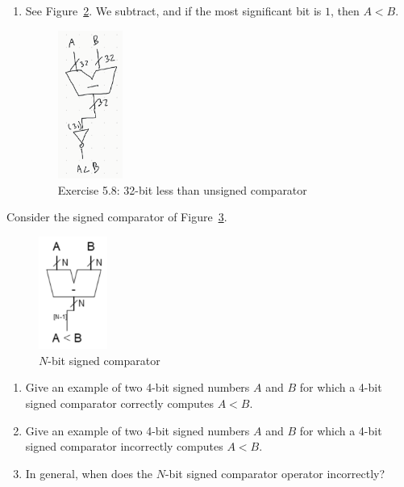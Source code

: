 \documentclass[12pt]{article}
\newenvironment{ex}[2][Exercise]{\begin{trivlist}
		\item[\hskip \labelsep {\bfseries #1}\hskip \labelsep {\bfseries #2.}]}{\end{trivlist}}
\newenvironment{sol}[1][Solution]{\begin{trivlist}
		\item[\hskip \labelsep {\bfseries #1:}]}{\end{trivlist}}
\begin{document}
\begin{sol}
\begin{enumerate}[label=(\alph*)]
\begin{figure}
			\label{greater-than-or-equal-to-32-bit-unsigned-comparator}
		\end{figure}
		\item See Figure~\ref{less-than-32-bit-unsigned-comparator}. We subtract,
		and if the most significant bit is $1$, then $A<B$.
		\begin{figure}
			\centering
			\includegraphics[width=0.2\textwidth]{less-than-32-bit-unsigned-comparator}
			\caption{Exercise 5.8: 32-bit less than unsigned comparator}
			\label{less-than-32-bit-unsigned-comparator}
		\end{figure}
	\end{enumerate}
\end{sol}

\begin{ex}{5.9}
	Consider the signed comparator of Figure~\ref{signed-comparator}.
	\begin{figure}
		\centering
		\includegraphics[width=0.2\textwidth]{signed-comparator}
		\caption{$N$-bit signed comparator}
		\label{signed-comparator}
	\end{figure}
	\begin{enumerate}[label=(\alph*)]
		\item Give an example of two 4-bit signed numbers $A$ and $B$ for which a 4-bit
		signed comparator correctly computes $A<B$.
		\item Give an example of two 4-bit signed numbers $A$ and $B$ for which a 4-bit
		signed comparator incorrectly computes $A<B$.
		\item In general, when does the $N$-bit signed comparator operator incorrectly?
	\end{enumerate}
\end{ex}
\end{document}
